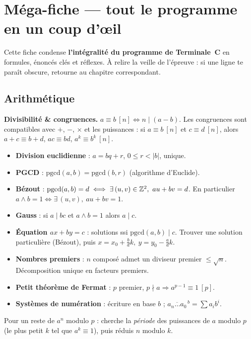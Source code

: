 \chapter{Méga-fiche — tout le programme en un coup d'œil}

\noindent Cette fiche condense \textbf{l'intégralité du programme de Terminale~C} en
formules, énoncés clés et réflexes. À relire la veille de l'épreuve : si une ligne
te paraît obscure, retourne au chapitre correspondant.

\section{Arithmétique}

\begin{aretenir}
\textbf{Divisibilité \& congruences.} $a\equiv b\ [n]\iff n\mid(a-b)$. Les congruences
sont compatibles avec $+$, $-$, $\times$ et les puissances : si $a\equiv b\ [n]$ et
$c\equiv d\ [n]$, alors $a+c\equiv b+d$, $ac\equiv bd$, $a^k\equiv b^k\ [n]$.
\end{aretenir}

\begin{itemize}
\item \textbf{Division euclidienne} : $a=bq+r$, $0\le r<|b|$, unique.
\item \textbf{PGCD} : $\mathrm{pgcd}(a,b)=\mathrm{pgcd}(b,r)$ (algorithme d'Euclide).
\item \textbf{Bézout} : $\mathrm{pgcd}(a,b)=d\iff \exists\,(u,v)\in\Z^2,\ au+bv=d$.
      En particulier $a\wedge b=1\iff \exists\,(u,v),\ au+bv=1$.
\item \textbf{Gauss} : si $a\mid bc$ et $a\wedge b=1$ alors $a\mid c$.
\item \textbf{Équation $ax+by=c$} : solutions ssi $\mathrm{pgcd}(a,b)\mid c$. Trouver une
      solution particulière (Bézout), puis $x=x_0+\frac{b}{d}k,\ y=y_0-\frac{a}{d}k$.
\item \textbf{Nombres premiers} : $n$ composé admet un diviseur premier $\le\sqrt n$.
      Décomposition unique en facteurs premiers.
\item \textbf{Petit théorème de Fermat} : $p$ premier, $p\nmid a\Rightarrow a^{p-1}\equiv1\ [p]$.
\item \textbf{Systèmes de numération} : écriture en base $b$ ; $\overline{a_n\dots a_0}^{\,b}=\sum a_i b^i$.
\end{itemize}

\begin{remarque}
Pour un reste de $a^n$ modulo $p$ : cherche la \emph{période} des puissances de $a$
modulo $p$ (le plus petit $k$ tel que $a^k\equiv1$), puis réduis $n$ modulo $k$.
\end{remarque}

